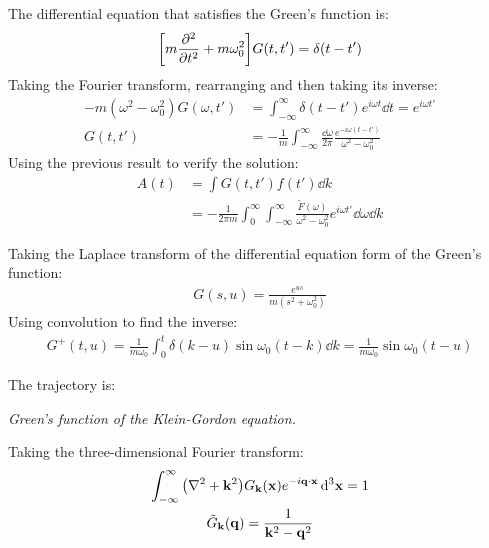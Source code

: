 \documentclass{report}
\begin{document}
\begin{subquests}
\begin{subquests}
		\item The differential equation that satisfies the Green's function is:
		\begin{gather*}
			\bqty{m\pdv[2]{t} + m\omega_0^2}G(t,t') = \delta(t-t')
		\end{gather*}
		Taking the Fourier transform, rearranging and then taking its inverse:
		\begin{align*}
			-m(\omega^2 - \omega_0^2)G(\omega,t') & = \int_{-\infty}^{\infty} \delta(t - t') e^{i\omega t} \dd{t} = e^{i\omega t'} \\
			G(t,t') & = -\frac{1}{m}\int_{-\infty}^{\infty}\frac{\dd{\omega}}{2\pi}\frac{e^{-i\omega(t-t')}}{\omega^2 - \omega_0^2} 
		\end{align*}
		Using the previous result to verify the solution:
		\begin{align*}
			A(t) & = \int G(t,t') f(t') \dd{k} \\
			& = -\frac{1}{2\pi m}\int_0^{\infty}\int_{-\infty}^{\infty}\frac{\tilde F(\omega)}{\omega^2 - \omega_0^2}e^{i\omega t'}\dd{\omega}\dd{k}
		\end{align*}

		\item Taking the Laplace transform of the differential equation form of the Green's function:
		\begin{gather*}
			G(s,u) = \frac{e^{us}}{m(s^2 + \omega_0^2)}
		\end{gather*}
		Using convolution to find the inverse:
		\begin{gather*}
			G^+(t,u) = \frac{1}{m\omega_0}\int_0^{t} \delta(k-u) \sin \omega_0(t - k) \dd{k}  = \frac{1}{m\omega_0}\sin\omega_0(t-u)
		\end{gather*}

		\item The trajectory is:
	\end{subquests}
	
	\item \emph{Green's function of the Klein-Gordon equation.}
	\begin{subquests}
		\item Taking the three-dimensional Fourier transform:
		\begin{gather*}
			\int_{-\infty}^{\infty} \pqty{\nabla^2 + \mathbf k^2}G_{\mathbf k}(\mathbf x)e^{-i\vb q\cdot \vb x}\,\dd^3{\vb x} = 1 \\
			\tilde G_{\mathbf k}(\mathbf q) = \frac{1}{\mathbf k^2 - \mathbf q^2}
		\end{gather*}
		

\end{subquests}
\end{subquests}
\end{document}
